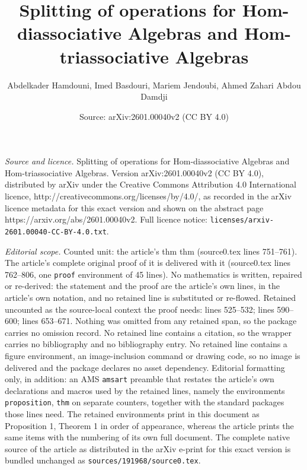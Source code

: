 \documentclass[10pt,a4paper]{amsart}
\title{Splitting of operations for Hom-diassociative Algebras and Hom-triassociative Algebras}
\author{Abdelkader Hamdouni, Imed Basdouri, Mariem Jendoubi, Ahmed Zahari Abdou Damdji}
\date{Source: arXiv:2601.00040v2 (CC BY 4.0)}
\begin{document}
\maketitle

\noindent\emph{Source and licence.} Splitting of operations for Hom-diassociative Algebras and Hom-triassociative Algebras. Version arXiv:2601.00040v2 (CC BY 4.0), distributed by arXiv under the Creative Commons Attribution 4.0 International licence, http://creativecommons.org/licenses/by/4.0/, as recorded in the arXiv licence metadata for this exact version and shown on the abstract page https://arxiv.org/abs/2601.00040v2. Full licence notice: \texttt{licenses/arxiv-2601.00040-CC-BY-4.0.txt}.\par\smallskip

\noindent\textit{Editorial scope.} Counted unit: the article's thm thm (source0.tex lines 751--761). The article's complete original proof of it is delivered with it (source0.tex lines 762--806, one \texttt{proof} environment of 45 lines). No mathematics is written, repaired or re-derived: the statement and the proof are the article's own lines, in the article's own notation, and no retained line is substituted or re-flowed.  Retained uncounted as the source-local context the proof needs: lines 525--532; lines 590--600; lines 653--671.  Nothing was omitted from any retained span, so the package carries no omission record.  No retained line contains a citation, so the wrapper carries no bibliography and no bibliography entry.  No retained line contains a figure environment, an image-inclusion command or drawing code, so no image is delivered and the package declares no asset dependency.  Editorial formatting only, in addition: an AMS \texttt{amsart} preamble that restates the article's own declarations and macros used by the retained lines, namely the environments \texttt{proposition}, \texttt{thm} on separate counters, together with the standard packages those lines need.  The retained environments print in this document as Proposition 1, Theorem 1 in order of appearance, whereas the article prints the same items with the numbering of its own full document.  The complete native source of the article as distributed in the arXiv e-print for this exact version is bundled unchanged as \texttt{sources/191968/source0.tex}.
\end{document}
